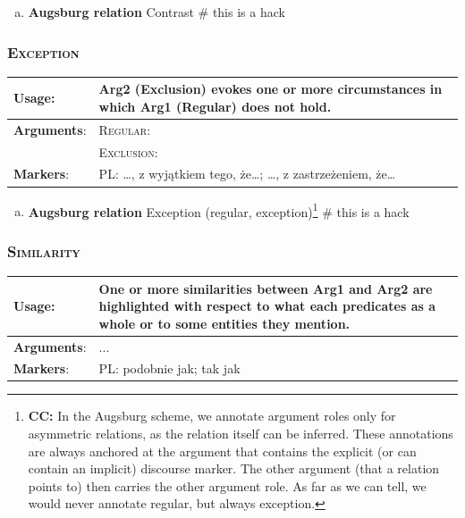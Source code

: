 \documentclass{udisc}
\newcommand{\noteCC}[1]{\footnote{{\textbf{CC:} {#1}}}}
\begin{document}
\begin{enumerate}[a)]
\item \textbf{Augsburg relation} Contrast
\nonstopmode # this is a hack
\end{enumerate}
\errorstopmode



\subsubsection{\textsc{Exception}}

\begin{tabularx}{\textwidth}{|l|L|}
\hline

\textbf{Usage}:           &  Arg2 (Exclusion) evokes one or more circumstances in which Arg1 (Regular) does not hold. \\
\hline

\textbf{Arguments}:       &  \textsc{Regular}:  \\
                          &  \textsc{Exclusion}:  \\
\hline

\textbf{Markers}:         &  PL: …, z wyjątkiem tego, że…; …, z zastrzeżeniem, że… \\
\hline

\end{tabularx}

\begin{enumerate}[a)]
\item \textbf{Augsburg relation} Exception (regular, exception)\noteCC{In the Augsburg scheme, we annotate argument roles only for asymmetric relations, as the relation itself can be inferred. These annotations are always anchored at the argument that contains the explicit (or can contain an implicit) discourse marker. The other argument (that a relation points to) then carries the other argument role. As far as we can tell, we would never annotate regular, but always exception.}
\nonstopmode # this is a hack
\end{enumerate}
\errorstopmode



\subsubsection{\textsc{Similarity}}

\begin{tabularx}{\textwidth}{|l|L|}
\hline

\textbf{Usage}:           &  One or more similarities between Arg1 and Arg2 are highlighted with respect to
what each predicates as a whole or to some entities they mention. \\
\hline

\textbf{Arguments}:       &  ... \\
\hline

\textbf{Markers}:         &  PL: podobnie jak; tak jak \\
\hline

\end{tabularx}
\end{document}
